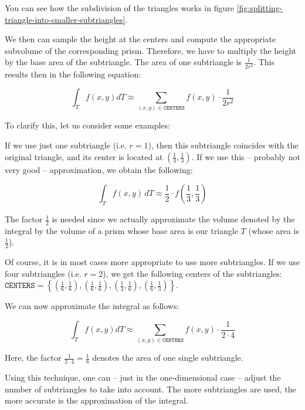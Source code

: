 \documentclass{article}
\begin{document}
You can see how the subdivision of the triangles works in figure \ref{fig:splitting-triangle-into-smaller-subtriangles}.

We then can sample the height at the centers and compute the appropriate subvolume of the corresponding prism. Therefore, we have to multiply the height by the base area of the subtriangle. The area of one subtriangle is $\frac{1}{2 r^2}$. This results then in the following equation:

\begin{equation}
  \int_T f(x,y) dT \approx \sum_{(x,y)\in\mathtt{CENTERS}} f(x,y) \cdot \frac{1}{2r^2}
\end{equation}

To clarify this, let us consider some examples:

If we use just one subtriangle (i.e. $r=1$), then this subtriangle coincides with the original triangle, and its center is located at $(\frac{1}{3}, \frac{1}{3})$. If we use this -- probably not very good -- approximation, we obtain the following:

\begin{equation*}
  \int_T f(x,y)\, dT \approx \frac{1}{2} \cdot f(\frac{1}{3},\frac{1}{3})
\end{equation*}

The factor $\frac{1}{2}$ is needed since we actually approximate the volume denoted by the integral by the volume of a prism whose base area is our triangle $T$ (whose area is $\frac{1}{2}$).

Of course, it is in most cases more appropriate to use more subtriangles. If we use four subtriangles (i.e. $r=2$), we get the following centers of the subtriangles: $\mathtt{CENTERS} = \left\{ (\frac{1}{6}, \frac{1}{6}), (\frac{1}{6}, \frac{1}{6}), (\frac{1}{3}, \frac{1}{6}), (\frac{1}{6},\frac{1}{3}) \right\}$.

We can now approximate the integral as follows:

\begin{equation*}
  \int_T f(x,y) dT \approx \sum_{(x,y)\in\mathtt{CENTERS}} f(x,y)\cdot \frac{1}{2\cdot 4}
\end{equation*}

Here, the factor $\frac{1}{2\cdot 4}= \frac{1}{8}$ denotes the area of one single subtriangle.

Using this technique, one can -- just in the one-dimensional case -- adjust the number of subtriangles to take into account. The more subtriangles are used, the more accurate is the approximation of the integral.
\end{document}
